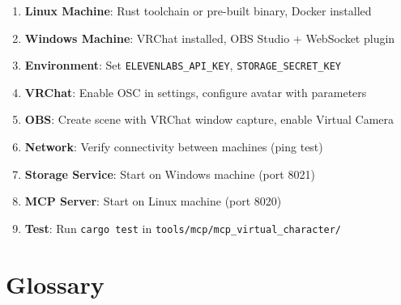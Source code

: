 \documentclass[11pt,letterpaper]{article}
\begin{document}
\begin{tcolorbox}[
  enhanced,
  colback=successgreen!5,
  colframe=successgreen!50,
  boxrule=1pt,
  arc=6pt,
  title={\textcolor{white}{\sffamily\bfseries Deployment Checklist}},
  colbacktitle=successgreen
]
\small
\begin{enumerate}[nosep, leftmargin=1.5em]
  \item[\ding{111}] \textbf{Linux Machine}: Rust toolchain or pre-built binary, Docker installed
  \item[\ding{111}] \textbf{Windows Machine}: VRChat installed, OBS Studio + WebSocket plugin
  \item[\ding{111}] \textbf{Environment}: Set \texttt{ELEVENLABS\_API\_KEY}, \texttt{STORAGE\_SECRET\_KEY}
  \item[\ding{111}] \textbf{VRChat}: Enable OSC in settings, configure avatar with parameters
  \item[\ding{111}] \textbf{OBS}: Create scene with VRChat window capture, enable Virtual Camera
  \item[\ding{111}] \textbf{Network}: Verify connectivity between machines (ping test)
  \item[\ding{111}] \textbf{Storage Service}: Start on Windows machine (port 8021)
  \item[\ding{111}] \textbf{MCP Server}: Start on Linux machine (port 8020)
  \item[\ding{111}] \textbf{Test}: Run \texttt{cargo test} in \texttt{tools/mcp/mcp\_virtual\_character/}
\end{enumerate}
\end{tcolorbox}

\section{Glossary}
\end{document}
